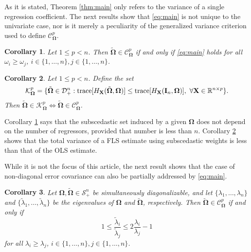 \documentclass[12pt]{article}
\newtheorem{corollary}{Corollary}
\newcommand{\tr}{\text{\rm trace}}
\newcommand{\bl}[1]{{\mathbf #1}}
\newcommand{\bs}[1]{\boldsymbol #1}
\begin{document}
{As it is stated, Theorem \ref{thm:main} only refers to the variance of a single regression coefficient. The next results show that \eqref{eq:main} is not unique to the univariate case, nor is it merely a peculiarity of the generalized variance criterion used to define $\mathcal{C}_{\bs{\Omega}}^p$.
\begin{corollary}\label{cor:main1}
Let $1 \leq p < n$. Then $\tilde{\bs{\Omega}} \in \mathcal{C}^p_{\bs{\Omega}}$ if and only if \eqref{eq:main} holds for all $\omega_i \geq \omega_j$, $i \in \{1, \dots, n\}, j \in \{1, \dots, n\}$.
\end{corollary}
\begin{corollary}\label{cor:main2}
    Let $1 \leq p < n$. Define the set
    \begin{equation*}
        \mathcal{K}^p_{\bs{\Omega}} = \{ \tilde{\bs{\Omega}} \in \mathcal{D}_+^n : \tr [H_{\bl{X}}(\tilde{\bs{\Omega}}, \bs{\Omega})] \leq \tr [H_{\bl{X}}(\bl{I}_n, \bs{\Omega}) ],~\forall \bl{X} \in \mathbb{R}^{n \times p} \}.
    \end{equation*}
    Then $\tilde{\bs{\Omega}} \in \mathcal{K}_{\bs{\Omega}}^p \iff \tilde{\bs{\Omega}} \in \mathcal{C}_{\bs{\Omega}}^p$.
\end{corollary}
Corollary \ref{cor:main1} says that the subscedastic set induced by a given $\bs{\Omega}$ does not depend on the number of regressors, provided that number is less than $n$. Corollary \ref{cor:main2} shows that the total variance of a FLS estimate using subscedastic weights is less than that of the OLS estimate.} {While it is not the focus of this article, the next result shows that the case of non-diagonal error covariance can also be partially addressed by \eqref{eq:main}.
\begin{corollary}\label{cor:main3}
    Let $\bs{\Omega}, \tilde{\bs{\Omega}} \in \mathcal{S}_+^n$ be simultaneously diagonalizable, and let $\{\lambda_1, \dots, \lambda_n\}$ and $\{\tilde{\lambda}_1, \dots, \tilde{\lambda}_n\}$ be the eigenvalues of $\bs{\Omega}$ and $\tilde{\bs{\Omega}}$, respectively. Then $\tilde{\bs{\Omega}} \in \mathcal{C}^p_{\bs{\Omega}}$ if and only if
    \begin{equation}
        1 \leq \frac{\tilde{\lambda}_i}{\tilde{\lambda}_j} \leq 2\frac{\lambda_i}{\lambda_j} - 1
    \end{equation}
    for all $\lambda_i \geq \lambda_j$, $i \in \{1, \dots, n\}, j \in \{1, \dots, n\}$. 
\end{corollary}}
\end{document}
